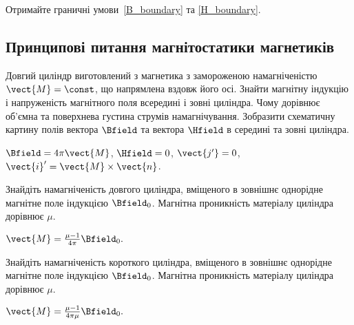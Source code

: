 \begin{problem}
	Отримайте граничні умови~\ref{B_boundary} та  \ref{H_boundary}.
\end{problem}



\subsection*{Принципові питання магнітостатики магнетиків}

\begin{problem}
	Довгий циліндр виготовлений з магнетика з замороженою намагніченістю $\vect{M} = \const$, що напрямлена вздовж його осі. Знайти магнітну індукцію і напруженість магнітного поля всередині і зовні циліндра. Чому дорівнює об'ємна та поверхнева густина струмів намагнічування. Зобразити схематичну картину полів вектора $\Bfield$ та вектора $\Hfield$ в середині та зовні циліндра.
\begin{solution}
	$\Bfield = 4\pi \vect{M}$, $\Hfield = 0$, $\vect{j'} = 0$, $\vect{i}' = \vect{M}\times \vect{n}$.
\end{solution}
\end{problem}

\begin{problem}
    Знайдіть намагніченість довгого циліндра, вміщеного в зовнішнє однорідне магнітне поле індукцією $\Bfield_0$. Магнітна проникність матеріалу циліндра дорівнює $\mu$.
\begin{solution}
	$\vect{M} = \frac{\mu - 1}{4\pi} \Bfield_0.$
\end{solution}
\end{problem}

\begin{problem}
    Знайдіть намагніченість короткого циліндра, вміщеного в зовнішнє однорідне магнітне поле індукцією $\Bfield_0$. Магнітна проникність матеріалу циліндра дорівнює $\mu$.
\begin{solution}
	$\vect{M} = \frac{\mu - 1}{4\pi\mu} \Bfield_0.$
\end{solution}
\end{problem}

